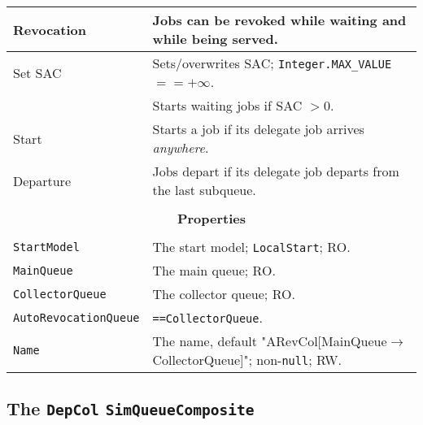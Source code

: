 \begin{tabular}{|l|l|}
	\hline
	Revocation & Jobs can be revoked while waiting and while being served. \\
	\hline
	Set SAC & Sets/overwrites SAC; \lstinline|Integer.MAX_VALUE| $== +\infty$. \\
	& Starts waiting jobs if SAC $> 0$. \\
	\hline
	Start & Starts a job if its delegate job arrives {\em anywhere}. \\
	\hline
	Departure & Jobs depart if its delegate job departs from the last subqueue. \\
	\hline
	\multicolumn{2}{|c|}{} \\
	\multicolumn{2}{|c|}{\bf Properties} \\
	\multicolumn{2}{|c|}{} \\
	\hline
	\lstinline|StartModel|    & The start model; \lstinline|LocalStart|; RO. \\
	\hline
	\lstinline|MainQueue| & The main queue; RO. \\
	\hline
	\lstinline|CollectorQueue| & The collector queue; RO. \\
	\hline
	\lstinline|AutoRevocationQueue| & \lstinline|==CollectorQueue|. \\
	\hline
	\lstinline|Name|          & The name, default "ARevCol[MainQueue$\rightarrow$CollectorQueue]"; non-\lstinline|null|; RW. \\
	\hline
\end{tabular}

\subsection{The \lstinline{DepCol} \lstinline{SimQueueComposite}}
\label{sec:DepCol}

